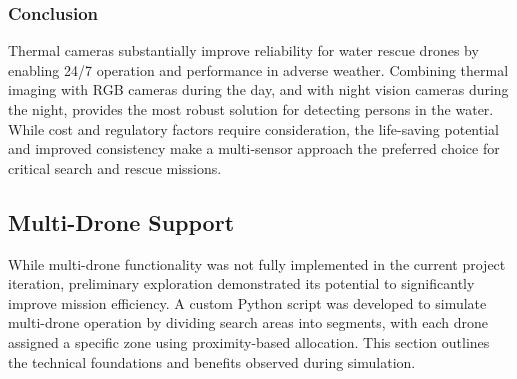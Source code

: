 \subsubsection{Conclusion}

Thermal cameras substantially improve reliability for water rescue drones by enabling 24/7 operation and performance in adverse weather. Combining thermal imaging with RGB cameras during the day, and with night vision cameras during the night, provides the most robust solution for detecting persons in the water. While cost and regulatory factors require consideration, the life-saving potential and improved consistency make a multi-sensor approach the preferred choice for critical search and rescue missions.




\subsection{Multi-Drone Support}

While multi-drone functionality was not fully implemented in the current project iteration, preliminary exploration demonstrated its potential to significantly improve mission efficiency. A custom Python script was developed to simulate multi-drone operation by dividing search areas into segments, with each drone assigned a specific zone using proximity-based allocation. This section outlines the technical foundations and benefits observed during simulation.

